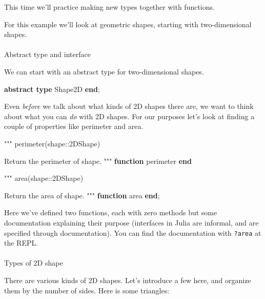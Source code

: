 \documentclass[
]{article}
\makeatletter
\let\oldparagraph\paragraph
\renewcommand{\paragraph}{
    \@ifstar
      \xxxParagraphStar
      \xxxParagraphNoStar
  }
\newcommand{\xxxParagraphStar}[1]{\oldparagraph*{#1}\mbox{}}
\newcommand{\xxxParagraphNoStar}[1]{\oldparagraph{#1}\mbox{}}
\newenvironment{Shaded}{\begin{snugshade}}{\end{snugshade}}
\newcommand{\KeywordTok}[1]{\textcolor[rgb]{0.00,0.23,0.31}{\textbf{#1}}}
\newcommand{\NormalTok}[1]{\textcolor[rgb]{0.00,0.23,0.31}{#1}}
\newcommand{\StringTok}[1]{\textcolor[rgb]{0.13,0.47,0.30}{#1}}
\makeatother
\begin{document}
This time we'll practice making new types together with functions.

For this example we'll look at geometric shapes, starting with
two-dimensional shapes.

\paragraph{Abstract type and
interface}\label{abstract-type-and-interface}

We can start with an abstract type for two-dimensional shapes.

\begin{Shaded}
\begin{Highlighting}[]
\KeywordTok{abstract type}\NormalTok{ Shape2D}
\KeywordTok{end}\NormalTok{;}
\end{Highlighting}
\end{Shaded}

Even \emph{before} we talk about what kinds of 2D shapes there are, we
want to think about what you can \emph{do} with 2D shapes. For our
purposes let's look at finding a couple of properties like perimeter and
area.

\begin{Shaded}
\begin{Highlighting}[]
\StringTok{"""}
\StringTok{   perimeter(shape::2DShape)}

\StringTok{Return the perimeter of \textasciigrave{}shape\textasciigrave{}.}
\StringTok{"""}
\KeywordTok{function}\NormalTok{ perimeter}
\KeywordTok{end}

\StringTok{"""}
\StringTok{   area(shape::2DShape)}

\StringTok{Return the area of \textasciigrave{}shape\textasciigrave{}.}
\StringTok{"""}
\KeywordTok{function}\NormalTok{ area}
\KeywordTok{end}\NormalTok{;}
\end{Highlighting}
\end{Shaded}

Here we've defined two functions, each with zero methods but some
documentation explaining their purpose (interfaces in Julia are
informal, and are specified through documentation). You can find the
documentation with \texttt{?area} at the REPL.

\paragraph{Types of 2D shape}\label{types-of-2d-shape}

There are various kinds of 2D shapes. Let's introduce a few here, and
organize them by the number of sides. Here is some triangles:
\end{document}
